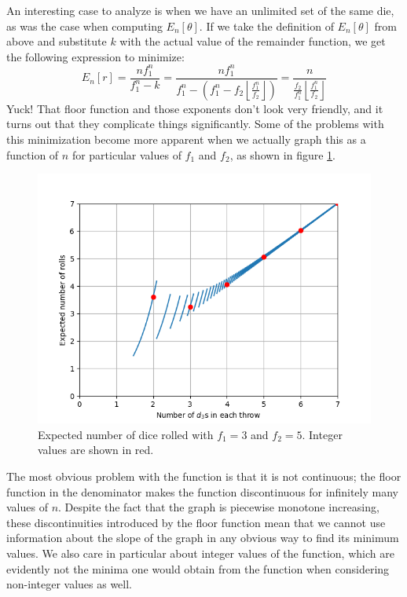 \documentclass{article}
\begin{document}
\par An interesting case to analyze is when we have an unlimited set of the same die, as was the case when computing $E_n[\theta]$.
If we take the definition of $E_n[\theta]$ from above and substitute $k$ with the actual value of the remainder function, we get the following expression to minimize: $$E_n[r] = \frac{nf_1^n}{f_1^n-k} = \frac{nf_1^n}{f_1^n-\left(f_1^n - f_2 \left \lfloor \frac{f_1^n}{f_2} \right \rfloor \right)} = \frac{n}{\frac{f_2}{f_1^n} \left \lfloor \frac{f_1^n}{f_2} \right \rfloor}$$ 
Yuck! 
That floor function and those exponents don't look very friendly, and it turns out that they complicate things significantly.
Some of the problems with this minimization become more apparent when we actually graph this as a function of $n$ for particular values of $f_1$ and $f_2$, as shown in figure \ref{fig:num-rolls}.
\begin{figure}
    \centering
    \includegraphics[scale=0.5]{num-rolls.png}
    \caption{Expected number of dice rolled with $f_1=3$ and $f_2=5$. Integer values are shown in red.}
    \label{fig:num-rolls}
\end{figure}
The most obvious problem with the function is that it is not continuous; the floor function in the denominator makes the function discontinuous for infinitely many values of $n$.
Despite the fact that the graph is piecewise monotone increasing, these discontinuities introduced by the floor function mean that we cannot use information about the slope of the graph in any obvious way to find its minimum values.
We also care in particular about integer values of the function, which are evidently not the minima one would obtain from the function when considering non-integer values as well.
\end{document}
